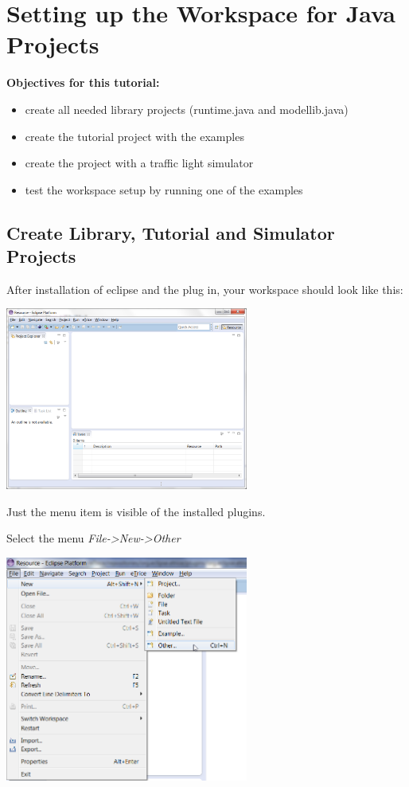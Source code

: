 \section{Setting up the Workspace for Java Projects}

\textbf{Objectives for this tutorial:}
\begin{itemize}
	\item create all needed library projects (runtime.java and modellib.java)
	\item create the tutorial project with the examples
	\item create the project with a traffic light simulator
	\item test the workspace setup by running one of the examples
\end{itemize}

\subsection{Create Library, Tutorial and Simulator Projects}

After installation of eclipse and the \eTrice{} plug in, your workspace should look like this:  

\includegraphics[width=0.6\textwidth]{images/013-SetupWorkspace01.png}

Just the \eTrice{} menu item is visible of the installed \eTrice{} plugins.

Select the menu \emph{File->New->Other}

\includegraphics[width=0.6\textwidth]{images/013-SetupWorkspace02.png}

